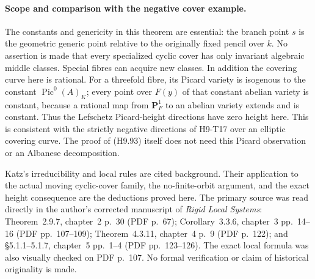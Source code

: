 \paragraph{Scope and comparison with the negative cover example.}
The constants and genericity in this theorem are essential:
the branch point $s$ is the geometric generic point relative
to the originally fixed pencil over $k$. No assertion is made
that every specialized cyclic cover has only invariant
algebraic middle classes. Special fibres can acquire new
classes. In addition the covering curve here is rational.
For a threefold fibre, its Picard variety is isogenous to the
constant $\operatorname{Pic}^0(A)_K$; every point over
$F(y)$ of that constant abelian variety is constant, because
a rational map from $\mathbf P^1_F$ to an abelian variety
extends and is constant. Thus the Lefschetz Picard-height
directions have zero height here. This is consistent with the
strictly negative directions of H9-T17 over an elliptic
covering curve. The proof of (H9.93) itself does not need this
Picard observation or an Albanese decomposition.

Katz's irreducibility and local rules are cited background.
Their application to the actual moving cyclic-cover family,
the no-finite-orbit argument, and the exact height consequence
are the deductions proved here. The primary source was read
directly in the author's corrected manuscript of
\emph{Rigid Local Systems}: Theorem~2.9.7, chapter~2 p.~30
(PDF p.~67); Corollary~3.3.6, chapter~3 pp.~14--16
(PDF pp.~107--109); Theorem~4.3.11, chapter~4 p.~9
(PDF p.~122); and \S5.1.1--5.1.7, chapter~5 pp.~1--4
(PDF pp.~123--126). The exact local formula was also visually
checked on PDF p.~107. No formal verification or claim of
historical originality is made.
